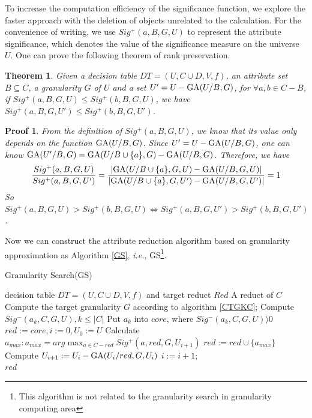 \documentclass[review]{elsarticle}
\newtheorem{myTheo}{Theorem}
\newtheorem*{myPrf}{Proof}
\begin{document}
	\par To increase the computation efficiency of the significance function, we explore the faster approach with the deletion of objects unrelated to the calculation. For the convenience of writing, we use $Sig^+(a,B,G,U)$ to represent the attribute significance, which denotes the value of the significance measure on the universe $U$. One can prove the following theorem of rank preservation.
	\begin{myTheo}
		Given a decision table $DT=(U,C \cup D,V,f)$, an attribute set $B \subseteq C$, a granularity $G$ of $U$ and a set $U'=U-{\rm GA}(U/B,G)$, for $\forall a,b\in C-B$, if $Sig^+(a,B,G,U) \leq Sig^+(b,B,G,U)$, we have $Sig^+(a,B,G,U')\leq Sig^+(b,B,G,U')$.
	\end{myTheo}
	\begin{myPrf}
		From the definition of $Sig^+(a,B,G,U)$, we know that its value only depends on the function ${\rm GA}(U/B,G)$. Since $U'=U-{\rm GA}(U/B,G)$, one can know ${\rm GA}(U'/B,G)={\rm GA}(U/B\cup\{a\},G)-{\rm GA}(U/B,G)$. Therefore, we have
		\begin{equation*}
		\frac{Sig^+(a,B,G,U)}{Sig^+(a,B,G,U')}=\frac{|{\rm GA}(U/B\cup\{a\},G,U)-{\rm GA}(U/B,G,U)|}{|{\rm GA}(U/B\cup\{a\},G,U')-{\rm GA}(U/B,G,U')|}=1
		\end{equation*}
		So $Sig^+(a,B,G,U)> Sig^+(b,B,G,U) \Leftrightarrow Sig^+(a,B,G,U')> Sig^+(b,B,G,U')$.
	\end{myPrf}
	Now we can construct the attribute reduction algorithm based on granularity approximation as Algorithm \ref{GS}, \emph{i.e.}, GS\footnote{This algorithm is not related to the granularity search in granularity computing area}. 
	\begin{algorithm}[htb]
		\caption{Granularity Search(GS)}
		\label{GS}
		\begin{algorithmic}[1]
			\Require decision table $DT=(U, C \cup D,V,f)$ and target reduct $Red$
			\Ensure A reduct of $C$
			\State Compute the target granularity $G$ according to algorithm \ref{CTGKC};
			\State Compute $Sig^-(a_k,C,G,U),k \leq |C|$
			\State Put $a_k$ into $core$, where $Sig^-(a_k,C,G,U)\rangle 0$
			\State $red:=core,i:=0, U_0:=U$
			\State Calculate $a_{max}:a_{max}=arg \max_{a \in C-red}Sig^+(a,red,G,U_{i+1})$
			\State $red:=red \cup \{a_{max}\}$
			\State Compute $U_{i+1}:=U_i-{\rm GA}(U_i/red,G,U_i)$
			\State $i:=i+1$;
			\EndWhile\\
			\Return $red$
		\end{algorithmic}
	\end{algorithm}
\end{document}
